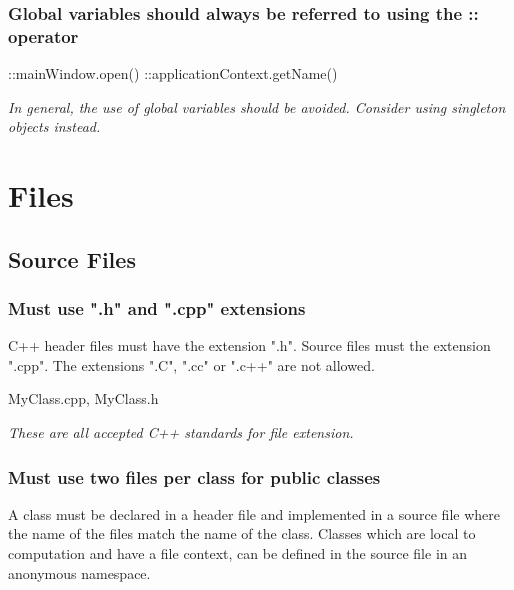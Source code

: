\documentclass[a4paper,11pt,oneside]{scrbook}
\newcommand{\guideline}[1]{{\subsection{#1}}}
\newcommand{\motivation}[1]{{\normalfont \itshape #1}}
\newcommand{\trfile}[1]{"#1"}
\newcommand{\trcode}[1]{{\normalfont \ttfamily #1}}
\begin{document}
\guideline{Global variables should always be referred to using the \trcode{::} operator}

\begin{code}
  ::mainWindow.open()
  ::applicationContext.getName() 
\end{code}

\motivation{ 
  In general, the use of global variables should be avoided. Consider using
  singleton objects instead.
}

\chapter{Files}

\section{Source Files}

\guideline{Must use \trfile{.h} and \trfile{.cpp} extensions}

C++ header files must have the extension \trfile{.h}. Source files must the
extension \trfile{.cpp}. The extensions \trfile{.C}, \trfile{.cc} or
\trfile{.c++} are not allowed.

\begin{code}
  MyClass.cpp, MyClass.h 
\end{code}

\motivation{
  These are all accepted C++ standards for file extension.
}

\guideline{Must use two files per class for public classes}
\label{subsec:two-files-per-class}

A class must be declared in a header file and implemented in a source file where
the name of the files match the name of the class. Classes which are local to
computation and have a file context, can be defined in the source file in an
anonymous namespace.
\end{document}
